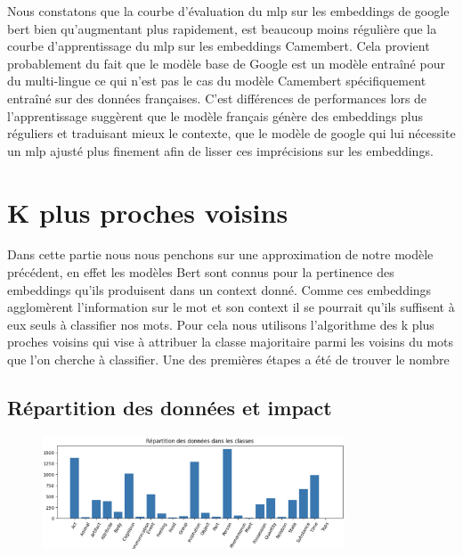 \documentclass[12pt]{article}
\begin{document}
Nous constatons que la courbe d'évaluation  du mlp sur les embeddings de google bert bien qu'augmentant plus rapidement, est
beaucoup moins régulière que la courbe d'apprentissage du mlp sur les embeddings Camembert. Cela provient probablement du fait 
que le modèle base de Google est un modèle entraîné pour du multi-lingue ce qui n'est pas le cas du modèle Camembert spécifiquement 
entraîné sur des données françaises. C'est différences de performances lors de l'apprentissage suggèrent que le modèle français génère 
des embeddings plus réguliers et traduisant mieux le contexte, que le modèle de google qui lui nécessite un mlp ajusté plus finement afin 
de lisser ces imprécisions sur les embeddings.


\section{K plus proches voisins}

Dans cette partie nous nous penchons sur une approximation de notre modèle précédent, en effet les modèles Bert sont connus 
pour la pertinence des embeddings qu'ils produisent dans un context donné. Comme ces embeddings agglomèrent l'information sur 
le mot et son context il se pourrait qu'ils suffisent à eux seuls à classifier nos mots. Pour cela nous utilisons l'algorithme
des k plus proches voisins qui vise à attribuer la classe majoritaire parmi les voisins du mots que l'on cherche à classifier. Une des premières étapes a été de trouver le nombre 

\subsection{Répartition des données et impact}
\begin{figure}[H]
    \centering
    \includegraphics[width=0.8\textwidth]{static/data_rep.png}
\end{figure}
\end{document}
